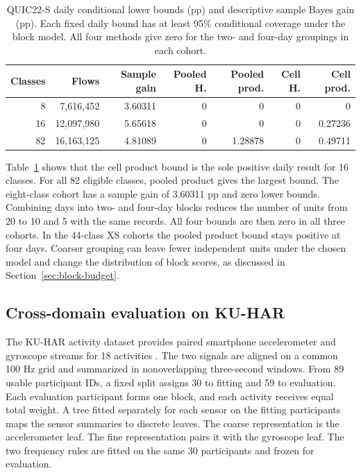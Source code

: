 \documentclass[preprint,11pt]{elsarticle}
\begin{document}
\begin{table}[!ht]
\centering
\small
\setlength{\tabcolsep}{4pt}
\caption{QUIC22-S daily conditional lower bounds (pp) and descriptive sample Bayes gain (pp). Each fixed daily bound has at least 95\% conditional coverage under the block model. All four methods give zero for the two- and four-day groupings in each cohort.}
\label{tab:quic22-s}
\begin{tabular}{rrrrrrr}
\toprule
Classes & Flows & Sample gain & Pooled H. & Pooled prod. & Cell H. & Cell prod. \\
\midrule
8 & 7,616,452 & 3.60311 & 0 & 0 & 0 & 0 \\
16 & 12,097,980 & 5.65618 & 0 & 0 & 0 & 0.27236 \\
82 & 16,163,125 & 4.81089 & 0 & 1.28878 & 0 & 0.49711 \\
\bottomrule
\end{tabular}
\end{table}

Table~\ref{tab:quic22-s} shows that the cell product bound is the sole positive daily result for 16 classes. For all 82 eligible classes, pooled product gives the largest bound. The eight-class cohort has a sample gain of 3.60311 pp and zero lower bounds. Combining days into two- and four-day blocks reduces the number of units from 20 to 10 and 5 with the same records. All four bounds are then zero in all three cohorts. In the 44-class XS cohorts the pooled product bound stays positive at four days. Coarser grouping can leave fewer independent units under the chosen model and change the distribution of block scores, as discussed in Section~\ref{sec:block-budget}.

\subsection{Cross-domain evaluation on KU-HAR}
\label{sec:kuhar}

The KU-HAR activity dataset provides paired smartphone accelerometer and gyroscope streams for 18 activities \cite{nahid2021kuhar}. The two signals are aligned on a common 100 Hz grid and summarized in nonoverlapping three-second windows. From 89 usable participant IDs, a fixed split assigns 30 to fitting and 59 to evaluation. Each evaluation participant forms one block, and each activity receives equal total weight. A tree fitted separately for each sensor on the fitting participants maps the sensor summaries to discrete leaves. The coarse representation is the accelerometer leaf. The fine representation pairs it with the gyroscope leaf. The two frequency rules are fitted on the same 30 participants and frozen for evaluation.
\end{document}
